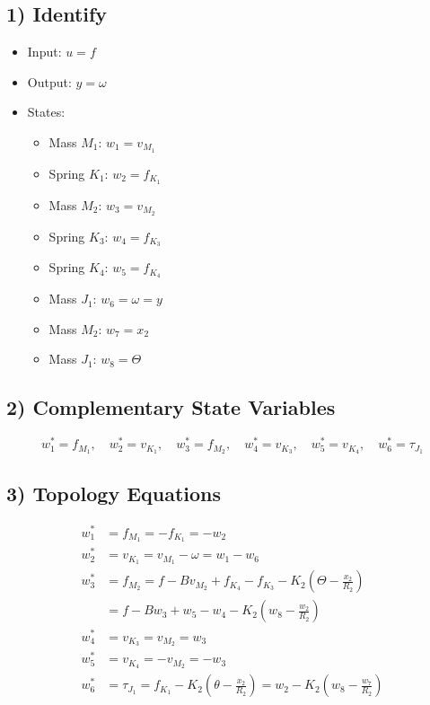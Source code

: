 \documentclass{article}
\begin{document}
\subsection*{1) Identify}
\begin{itemize}
    \item Input: \( u = f \)
    \item Output: \( y = \omega \)
    \item States:
    \begin{itemize}
        \item Mass \( M_1 \): \( w_1 = v_{M_1} \)
        \item Spring \( K_1 \): \( w_2 = f_{K_1} \)
        \item Mass \( M_2 \): \( w_3 = v_{M_2} \)
        \item Spring \( K_3 \): \( w_4 = f_{K_3} \)
        \item Spring \( K_4 \): \( w_5 = f_{K_4} \)
        \item Mass \( J_1 \): \( w_6 = \omega = y \)
        \item Mass \( M_2 \): \( w_7 = x_2 \)
        \item Mass \( J_1 \): \( w_8 = \Theta \)
    \end{itemize}
\end{itemize}

\subsection*{2) Complementary State Variables}
\[
w_1^* = f_{M_1}, \quad w_2^* = v_{K_1}, \quad w_3^* = f_{M_2}, \quad w_4^* = v_{K_3}, \quad w_5^* = v_{K_4}, \quad w_6^* = \tau_{J_1}
\]

\subsection*{3) Topology Equations}
\begin{align*}
w_1^* &= f_{M_1} = -f_{K_1} = -w_2 \\
w_2^* &= v_{K_1} = v_{M_1} - \omega = w_1 - w_6 \\
w_3^* &= f_{M_2} = f - B v_{M_2} + f_{K_4} - f_{K_3} - K_2 \left( \Theta - \frac{x_2}{R_2} \right) \\
      &= f - B w_3 + w_5 - w_{4} - K_2 \left( w_8 - \frac{w_2}{R_2} \right) \\
w_4^* &= v_{K_3} = v_{M_2} = w_3 \\
w_5^* &= v_{K_4} = -v_{M_2} = -w_3 \\
w_6^* &= \tau_{J_1} = f_{K_1} - K_2 \left( \theta - \frac{x_2}{R_2} \right) = w_2 - K_2 \left( w_8 - \frac{w_7}{R_2} \right)
\end{align*}
\end{document}
